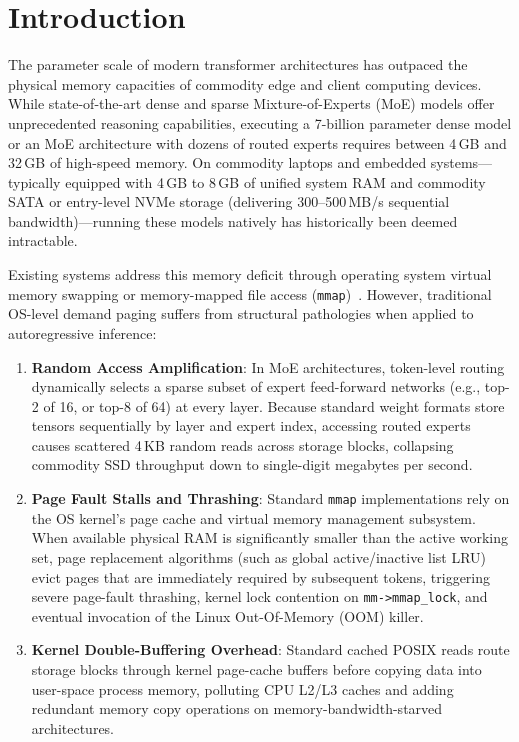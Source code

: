 \section{Introduction}
\label{sec:intro}

The parameter scale of modern transformer architectures has outpaced the physical memory capacities of commodity edge and client computing devices. While state-of-the-art dense and sparse Mixture-of-Experts (MoE) models offer unprecedented reasoning capabilities, executing a 7-billion parameter dense model or an MoE architecture with dozens of routed experts requires between 4\,GB and 32\,GB of high-speed memory. On commodity laptops and embedded systems—typically equipped with 4\,GB to 8\,GB of unified system RAM and commodity SATA or entry-level NVMe storage (delivering 300--500\,MB/s sequential bandwidth)—running these models natively has historically been deemed intractable.

Existing systems address this memory deficit through operating system virtual memory swapping or memory-mapped file access (\texttt{mmap})~\citep{sheng2023flexgen,gerganov2023llama}. However, traditional OS-level demand paging suffers from structural pathologies when applied to autoregressive inference:
\begin{enumerate}
    \item \textbf{Random Access Amplification}: In MoE architectures, token-level routing dynamically selects a sparse subset of expert feed-forward networks (e.g., top-2 of 16, or top-8 of 64) at every layer. Because standard weight formats store tensors sequentially by layer and expert index, accessing routed experts causes scattered 4\,KB random reads across storage blocks, collapsing commodity SSD throughput down to single-digit megabytes per second.
    \item \textbf{Page Fault Stalls and Thrashing}: Standard \texttt{mmap} implementations rely on the OS kernel's page cache and virtual memory management subsystem. When available physical RAM is significantly smaller than the active working set, page replacement algorithms (such as global active/inactive list LRU) evict pages that are immediately required by subsequent tokens, triggering severe page-fault thrashing, kernel lock contention on \texttt{mm->mmap\_lock}, and eventual invocation of the Linux Out-Of-Memory (OOM) killer.
    \item \textbf{Kernel Double-Buffering Overhead}: Standard cached POSIX reads route storage blocks through kernel page-cache buffers before copying data into user-space process memory, polluting CPU L2/L3 caches and adding redundant memory copy operations on memory-bandwidth-starved architectures.
\end{enumerate}

